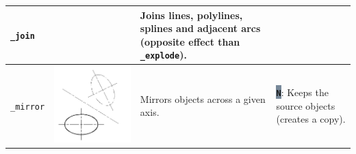 \documentclass[..]{../IEEEphot}
\newcommand{\param}[1]{\colorbox{LightSlateGray}{\color{Navy}\texttt{\textbf{#1}}}}
\begin{document}
\begin{center}
\begin{longtable}{m{.2\linewidth}m{.2\linewidth}m{.25\linewidth}m{.25\linewidth}}
\\
\midrule
\texttt{\_join} & & Joins lines, polylines, splines and adjacent arcs (opposite effect than \texttt{\_explode}). & 
\\
\midrule
\texttt{\_mirror} & \includegraphics[width = 0.8\linewidth, keepaspectratio]{../images/jpg/_mirror.jpg} & Mirrors objects across a given axis. & 
\param{N}: Keeps the source objects (creates a copy).


\end{longtable}
\end{center}
\end{document}
